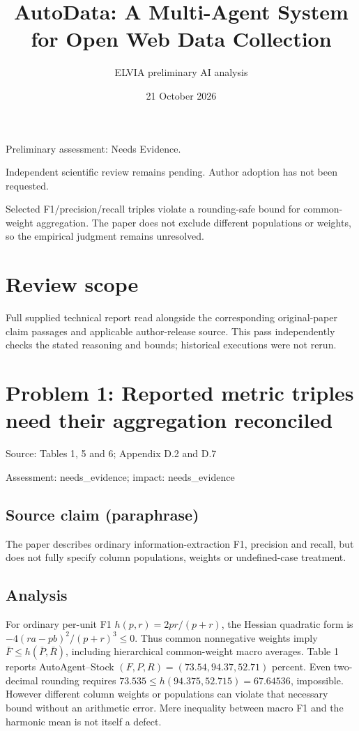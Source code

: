 \documentclass[11pt]{article}
\begin{document}
\title{AutoData: A Multi-Agent System for Open Web Data Collection}

\author{ELVIA preliminary AI analysis}\date{21 October 2026}\maketitle

Preliminary assessment: Needs Evidence.\par

Independent scientific review remains pending. Author adoption has not been requested.

Selected F1/precision/recall triples violate a rounding-safe bound for common-weight aggregation. The paper does not exclude different populations or weights, so the empirical judgment remains unresolved.

\section*{Review scope}

Full supplied technical report read alongside the corresponding original-paper claim passages and applicable author-release source. This pass independently checks the stated reasoning and bounds; historical executions were not rerun.

\section*{Problem 1: Reported metric triples need their aggregation reconciled}

Source: Tables 1, 5 and 6; Appendix D.2 and D.7

Assessment: needs\_evidence; impact: needs\_evidence

\subsection*{Source claim (paraphrase)}

The paper describes ordinary information-extraction F1, precision and recall, but does not fully specify column populations, weights or undefined-case treatment.

\subsection*{Analysis}

For ordinary per-unit F1 \(h(p,r)=2pr/(p+r)\), the Hessian quadratic form is \(-4(ra-pb)^2/(p+r)^3\le0\). Thus common nonnegative weights imply \(\bar F\le h(\bar P,\bar R)\), including hierarchical common-weight macro averages. Table 1 reports AutoAgent–Stock \((F,P,R)=(73.54,94.37,52.71)\) percent. Even two-decimal rounding requires \(73.535\le h(94.375,52.715)=67.64536\), impossible. However different column weights or populations can violate that necessary bound without an arithmetic error. Mere inequality between macro F1 and the harmonic mean is not itself a defect.
\end{document}
